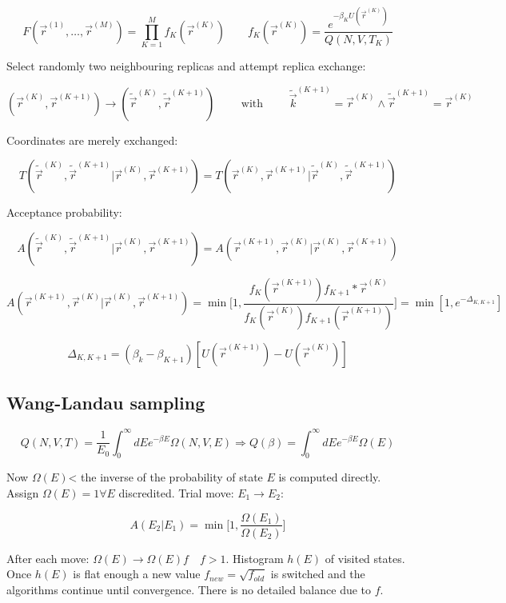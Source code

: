 	$$F(\vec{r}^{(1)}, \dots, \vec{r}^{(M)}) = \prod\limits_{K=1}^Mf_K(\vec{r}^{(K)})\qquad f_K(\vec{r}^{(K)}) = \frac{e^{-\beta_K U(\vec{r}^{(K)})}}{Q(N ,V, T_K)}$$

	Select randomly two neighbouring replicas and attempt replica exchange:

	$$(\vec{r}^{(K)}, \vec{r}^{(K+1)})\rightarrow (\tilde{\vec{r}}^{(K)}, \tilde{\vec{r}}^{(K+1)})\qquad\text{ with }\qquad \tilde{\vec{k}}^{(K+1)} = \vec{r}^{(K)}\land \tilde{\vec{r}}^{(K+1)}=\vec{r}^{(K)}$$

	Coordinates are merely exchanged:

	$$T(\tilde{\vec{r}}^{(K)}, \tilde{\vec{r}}^{(K+1)}|\vec{r}^{(K)}, \vec{r}^{(K+1)}) = T(\vec{r}^{(K)}, \vec{r}^{(K+1)}|\tilde{\vec{r}}^{(K)}, \tilde{\vec{r}}^{(K+1)})$$

	Acceptance probability:

	$$A(\tilde{\vec{r}}^{(K)}, \tilde{\vec{r}}^{(K+1)}|\vec{r}^{(K)}, \vec{r}^{(K+1)}) = A(\vec{r}^{(K+1)}, \vec{r}^{(K)} | \vec{r}^{(K)}, \vec{r}^{(K+1)})$$

	$$A(\vec{r}^{(K+1)}, \vec{r}^{(K)} | \vec{r}^{(K)}, \vec{r}^{(K+1)}) = \min\biggl[1, \frac{f_K(\vec{r}^{(K+1)})f_{K+1}*\vec{r}^{(K)}}{f_K(\vec{r}^{(K)})f_{K+1}(\vec{r}^{(K+1)})}\biggr] = \min[1, e^{-\Delta_{K, K+1}}]$$

	$$\Delta_{K, K+1} = (\beta_k-\beta_{K+1})[U(\vec{r}^{(K+1)}) - U(\vec{r}^{(K)})]$$

	\subsection{Wang-Landau sampling}

	$$Q(N, V, T) = \frac{1}{E_0}\int_0^{\infty}dEe^{-\beta E}\Omega(N, V, E)\Rightarrow Q(\beta) = \int_0^{\infty}dEe^{-\beta E}\Omega(E)$$

	Now $\Omega(E)$< the inverse of the probability of state $E$ is computed directly.
	Assign $\Omega(E)=1\forall E$ discredited.
	Trial move: $E_1\rightarrow E_2$:

	$$A(E_2|E_1) = \min\biggl[1, \frac{\Omega(E_1)}{\Omega(E_2)}\biggr]$$

	After each move: $\Omega(E)\rightarrow \Omega(E)f\quad f>1$.
	Histogram $h(E)$ of visited states.
	Once $h(E)$ is flat enough a new value $f_{new} = \sqrt{f_{old}}$ is switched and the algorithms continue until convergence.
	There is no detailed balance due to $f$.

